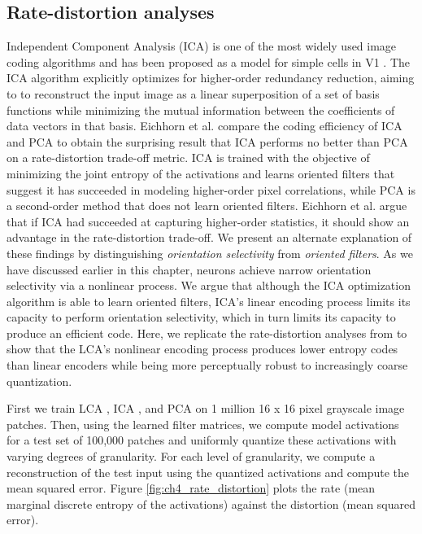 \subsection{Rate-distortion analyses}
Independent Component Analysis (ICA) is one of the most widely used image coding algorithms and has been proposed as a model for simple cells in V1 \parencite{bell1997independent, hyvarinen1999fast}.
The ICA algorithm explicitly optimizes for higher-order redundancy reduction, aiming to to reconstruct the input image as a linear superposition of a set of basis functions while minimizing the mutual information between the coefficients of data vectors in that basis.
Eichhorn et al. \citeyearpar{eichhorn2009natural} compare the coding efficiency of ICA and PCA to obtain the surprising result that ICA performs no better than PCA on a rate-distortion trade-off metric.
ICA is trained with the objective of minimizing the joint entropy of the activations and learns oriented filters that suggest it has succeeded in modeling higher-order pixel correlations, while PCA is a second-order method that does not learn oriented filters.
Eichhorn et al. \citeyearpar{eichhorn2009natural} argue that if ICA had succeeded at capturing higher-order statistics, it should show an advantage in the rate-distortion trade-off.
We present an alternate explanation of these findings by distinguishing \textit{orientation selectivity} from \textit{oriented filters}.
As we have discussed earlier in this chapter, neurons achieve narrow orientation selectivity via a nonlinear process.
We argue that although the ICA optimization algorithm is able to learn oriented filters, ICA's linear encoding process limits its capacity to perform orientation selectivity, which in turn limits its capacity to produce an efficient code.
Here, we replicate the rate-distortion analyses from \parencite{eichhorn2009natural} to show that the LCA's nonlinear encoding process produces lower entropy codes than linear encoders while being more perceptually robust to increasingly coarse quantization.

First we train LCA \parencite{rozell2008sparse}, ICA \parencite{bell1997independent}, and PCA \parencite{jolliffe2016principal} on 1 million 16 x 16 pixel grayscale image patches. Then, using the learned filter matrices, we compute model activations for a test set of 100,000 patches and uniformly quantize these activations with varying degrees of granularity. For each level of granularity, we compute a reconstruction of the test input using the quantized activations and compute the mean squared error. Figure \ref{fig:ch4_rate_distortion} plots the rate (mean marginal discrete entropy of the activations) against the distortion (mean squared error).


